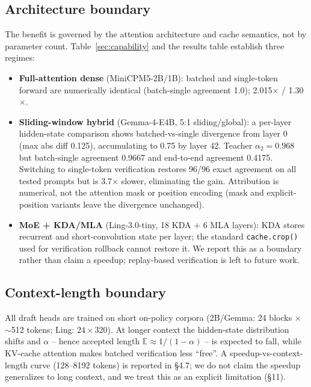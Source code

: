 \documentclass[11pt,a4paper]{article}
\begin{document}
\subsection{Architecture boundary}
\label{sec:arch-boundary}
The benefit is governed by the attention architecture and cache semantics, not by parameter
count. Table~\ref{sec:capability} and the results table establish three regimes:
\begin{itemize}[leftmargin=*]
  \item \textbf{Full-attention dense} (MiniCPM5-2B/1B): batched and single-token forward are
        numerically identical (batch-single agreement 1.0); 2.015$\times$ / 1.30$\times$.
  \item \textbf{Sliding-window hybrid} (Gemma-4-E4B, 5:1 sliding/global): a per-layer hidden-state
        comparison shows batched-vs-single divergence from layer 0 (max abs diff 0.125),
        accumulating to 0.75 by layer 42. Teacher $\alpha_2=0.968$ but batch-single agreement
        0.9667 and end-to-end agreement 0.4175. Switching to single-token verification restores
        96/96 exact agreement on all tested prompts but is 3.7$\times$ slower, eliminating the
        gain. Attribution is numerical, not the attention mask or position encoding (mask and
        explicit-position variants leave the divergence unchanged).
  \item \textbf{MoE + KDA/MLA} (Ling-3.0-tiny, 18 KDA + 6 MLA layers): KDA stores recurrent and
        short-convolution state per layer; the standard \texttt{cache.crop()} used for verification
        rollback cannot restore it. We report this as a boundary rather than claim a speedup;
        replay-based verification is left to future work.
\end{itemize}

\subsection{Context-length boundary}
\label{sec:ctx-boundary}
All draft heads are trained on short on-policy corpora (2B/Gemma: 24 blocks $\times$ $\sim$512
tokens; Ling: $24\times320$). At longer context the hidden-state distribution shifts and
$\alpha$ -- hence accepted length $\mathbb{E}\!\approx\!1/(1-\alpha)$ -- is expected to fall,
while KV-cache attention makes batched verification less ``free''. A speedup-vs-context-length
curve (128--8192 tokens) is reported in \S4.7; we do not claim the speedup generalizes to long
context, and we treat this as an explicit limitation (\S11).
\end{document}
